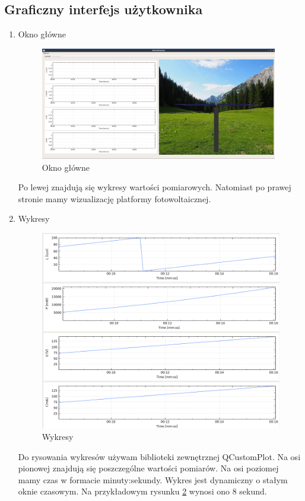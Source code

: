 \documentclass[10pt, a4paper]{article}
\begin{document}
	\subsection{Graficzny interfejs użytkownika}
		\begin{enumerate}
			\item Okno główne
				\begin{figure}[H]
					\centering
					\includegraphics[width=0.98\textwidth]{figures/okno_glowne1.png}
					\caption{Okno główne}
					\label{fig:okno_glowne1}
				\end{figure}
			Po lewej znajdują się wykresy wartości pomiarowych. Natomiast po prawej stronie mamy wizualizację platformy fotowoltaicznej.
					
			\item Wykresy
				\begin{figure}[H]
					\centering
					\includegraphics[width=1.0\textwidth]{figures/wykresy.png}
					\caption{Wykresy}
					\label{fig:wykresy}
				\end{figure}
			Do rysowania wykresów używam biblioteki zewnętrznej QCustomPlot. Na osi pionowej znajdują się poszczególne wartości pomiarów. Na osi poziomej mamy czas w formacie minuty:sekundy. Wykres jest dynamiczny o stałym oknie czasowym. Na przykładowym rysunku \ref{fig:wykresy} wynosi ono 8 sekund.
			

\end{enumerate}
\end{document}
